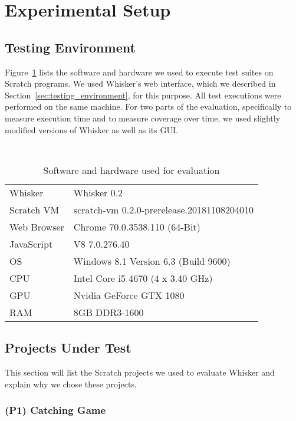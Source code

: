 \section{Experimental Setup}
\label{sec:experimental_setup}

\subsection{Testing Environment}

Figure~\ref{tab:evaluation_setup} lists the software and hardware we used to execute test suites on Scratch programs.
We used Whisker's web interface, which we described in Section~\ref{sec:testing_environment}, for this purpose.
All test executions were performed on the same machine.
For two parts of the evaluation,
specifically to measure execution time and to measure coverage over time,
we used slightly modified versions of Whisker as well as its GUI.

\begin{table}[htpb]
    \centering
    \scriptsize \tt
    \begin{tabular}{ll}
        \toprule
        Whisker     & Whisker 0.2 \\
        Scratch VM  & scratch-vm 0.2.0-prerelease.20181108204010 \\
        Web Browser & Chrome 70.0.3538.110 (64-Bit) \\
        JavaScript  & V8 7.0.276.40 \\
        OS          & Windows 8.1 Version 6.3 (Build 9600) \\
        CPU         & Intel Core i5 4670 (4 x  3.40 GHz) \\
        GPU         & Nvidia GeForce GTX 1080 \\
        RAM         & 8GB DDR3-1600 \\
        \bottomrule
    \end{tabular}
    \caption{Software and hardware used for evaluation}
    \label{tab:evaluation_setup}
\end{table}

\subsection{Projects Under Test}

This section will list the Scratch projects we used to evaluate Whisker and explain why we chose these projects.

\subsubsection{(P1) Catching Game}

